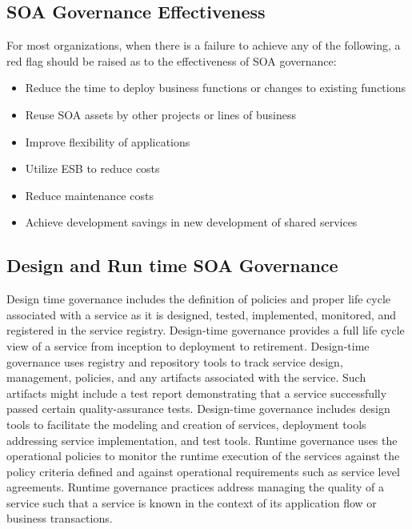 \documentclass[12pt,a4paper,final,twoside,onecolumn,titlepage]{book}
\begin{document}
\subsection{SOA Governance Effectiveness}
For most organizations, when there is a failure to achieve any of the following, a red flag should be raised as to the effectiveness of \gls{SOA} governance:
\begin{itemize}
\item Reduce the time to deploy business functions or changes to existing functions
\item Reuse \gls{SOA} assets by other projects or lines of business
\item Improve flexibility of applications
\item Utilize ESB to reduce costs
\item Reduce maintenance costs
\item Achieve development savings in new development of shared services
\end{itemize}
\subsection{Design and Run time SOA Governance}
Design time governance includes the definition of policies and proper life cycle associated with a service as it is designed, tested, implemented, monitored, and registered in the service registry. Design-time governance provides a full life cycle view of a service from inception to deployment to retirement. Design-time governance uses registry and repository tools to track service design, management, policies, and any artifacts associated with the service. Such artifacts might include a test report demonstrating that a service successfully passed certain quality-assurance tests. Design-time governance includes design tools to facilitate the modeling and creation of services, deployment tools addressing service implementation, and test tools. Runtime governance uses the operational policies to monitor the runtime execution of the services against the policy criteria defined and against operational requirements such as service level agreements. Runtime governance practices address managing the quality of a service such that a service is known in the context of its application flow or business transactions. 
\end{document}
